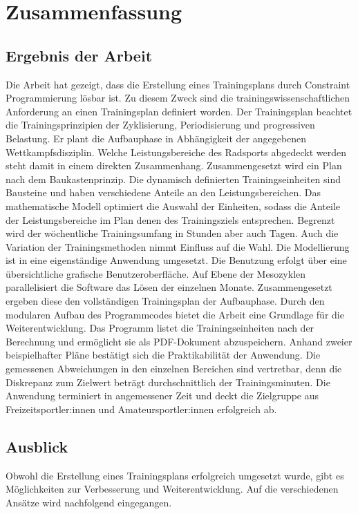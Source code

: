\chapter{Zusammenfassung}
\label{sec:zusammenfassung}
\section{Ergebnis der Arbeit}
\label{sec:zusammenfassung:ergebnis}
Die Arbeit hat gezeigt, dass die Erstellung eines Trainingsplans durch Constraint Programmierung lösbar ist. Zu diesem Zweck sind die trainingswissenschaftlichen Anforderung an einen Trainingsplan definiert worden. Der Trainingsplan beachtet die Trainingsprinzipien der Zyklisierung, Periodisierung und progressiven Belastung. Er plant die Aufbauphase in Abhängigkeit der angegebenen Wettkampfsdisziplin. Welche Leistungsbereiche des Radsports abgedeckt werden steht damit in einem direkten Zusammenhang.\newline 
Zusammengesetzt wird ein Plan nach dem Baukastenprinzip. Die dynamisch definierten Trainingseinheiten sind Bausteine und haben verschiedene Anteile an den Leistungsbereichen. Das mathematische Modell optimiert die Auswahl der Einheiten, sodass die Anteile der Leistungsbereiche im Plan denen des Trainingsziels entsprechen. Begrenzt wird der wöchentliche Trainingsumfang in Stunden aber auch Tagen. Auch die Variation der Trainingsmethoden nimmt Einfluss auf die Wahl.\newline
Die Modellierung ist in eine eigenständige Anwendung umgesetzt. Die Benutzung erfolgt über eine übersichtliche grafische Benutzeroberfläche. Auf Ebene der Mesozyklen parallelisiert die Software das Lösen der einzelnen Monate. Zusammengesetzt ergeben diese den vollständigen Trainingsplan der Aufbauphase. Durch den modularen Aufbau des Programmcodes bietet die Arbeit eine Grundlage für die Weiterentwicklung. Das Programm listet die Trainingseinheiten nach der Berechnung und ermöglicht sie als PDF-Dokument abzuspeichern.\newline
Anhand zweier beispielhafter Pläne bestätigt sich die Praktikabilität der Anwendung. Die gemessenen Abweichungen in den einzelnen Bereichen sind vertretbar, denn die Diskrepanz zum Zielwert beträgt durchschnittlich  der Trainingsminuten. Die Anwendung terminiert in angemessener Zeit und deckt die Zielgruppe aus Freizeitsportler:innen und Amateursportler:innen erfolgreich ab.

\section{Ausblick}
\label{sec:zusammenfassung:ausblick}
Obwohl die Erstellung eines Trainingsplans erfolgreich umgesetzt wurde, gibt es Möglichkeiten zur Verbesserung und Weiterentwicklung. Auf die verschiedenen Ansätze wird nachfolgend eingegangen.

